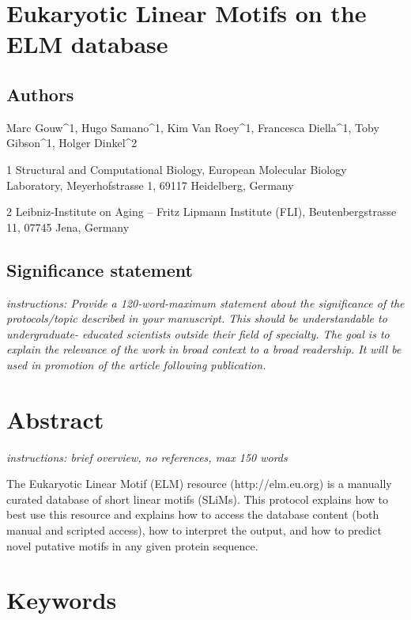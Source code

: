 \section{Eukaryotic Linear Motifs on the ELM
database}\label{eukaryotic-linear-motifs-on-the-elm-database}

\subsection{Authors}\label{authors}

Marc Gouw\^{}1, Hugo Samano\^{}1, Kim Van Roey\^{}1, Francesca
Diella\^{}1, Toby Gibson\^{}1, Holger Dinkel\^{}2

1 Structural and Computational Biology, European Molecular Biology
Laboratory, Meyerhofstrasse 1, 69117 Heidelberg, Germany

2 Leibniz-Institute on Aging -- Fritz Lipmann Institute (FLI),
Beutenbergstrasse 11, 07745 Jena, Germany

\subsection{Significance statement}\label{significance-statement}

\emph{instructions: Provide a 120-word-maximum statement about the
significance of the protocols/topic described in your manuscript. This
should be understandable to undergraduate- educated scientists outside
their field of specialty. The goal is to explain the relevance of the
work in broad context to a broad readership. It will be used in
promotion of the article following publication.}

\section{Abstract}\label{abstract}

\emph{instructions: brief overview, no references, max 150 words}

The Eukaryotic Linear Motif (ELM) resource (http://elm.eu.org) is a
manually curated database of short linear motifs (SLiMs). This protocol
explains how to best use this resource and explains how to access the
database content (both manual and scripted access), how to interpret the
output, and how to predict novel putative motifs in any given protein
sequence.

\section{Keywords}\label{keywords}

